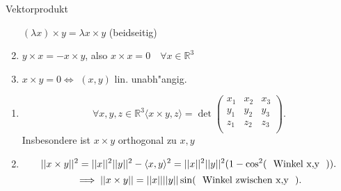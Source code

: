 \documentclass[class=article, crop=false]{standalone}
\begin{document}
\begin{zettel}{Vektorprodukt}
\begin{remark}
\begin{enumerate}
            $(\lambda x )\times y =  \lambda  x \times y$ (beidseitig)
        \item $y \times  x =  -  x \times y$, also $x \times x = 0 \quad \forall x \in  \mathbb{R}^3 $ 
        \item $x \times y = 0 \iff $ $(x,y)$ lin. unabh"angig.
    \end{enumerate}
\end{remark}
\begin{lemma}[4.1]
    \begin{enumerate}
    \item 
    \[
        \forall x,y,z \in  \mathbb{R}^3  \langle x \times  y, z\rangle =  \det \begin{pmatrix}
        x_1  & x_2  & x_3  \\
        y_1  & y_2  & y_3  \\
        z_1  & z_2  & z_3  \\
        \end{pmatrix}
    .\] 
    Insbesondere ist $x \times y$ orthogonal zu $x,y$ 
    \item 
        \[
            ||x \times y||^2  = ||x||^2 ||y||^2 - \langle x,y\rangle ^2 = ||x||^2 ||y||^2 (1 - \cos^2( \tx{ Winkel x,y } ))
        .\]
        \[
             \implies ||x \times y|| =  ||x|| ||y|| \sin( \tx{ Winkel zwischen x,y } )
        .\]
    
    \end{enumerate}
\end{lemma}
\end{zettel}
\end{document}
